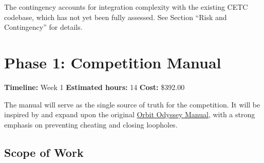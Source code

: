 \documentclass[a4paper]{article}
\begin{document}
\vspace{0.5em}
\noindent The contingency accounts for integration complexity with the existing CETC codebase, which has not yet been fully assessed. See Section ``Risk and Contingency'' for details.

\section*{Phase 1: Competition Manual}

\noindent\textbf{Timeline:} Week 1 \hfill \textbf{Estimated hours:} 14 \hfill \textbf{Cost:} \$392.00

\vspace{0.5em}

The manual will serve as the single source of truth for the competition. It will be inspired by and expand upon the original \href{https://docs.google.com/document/d/1N_mCX1EM3w5nDMbHrX3vcQlSqa2yJL38nCU0xxMPxmY/edit?tab=t.0}{Orbit Odyssey Manual}, with a strong emphasis on preventing cheating and closing loopholes.

\subsection*{Scope of Work}
\end{document}
